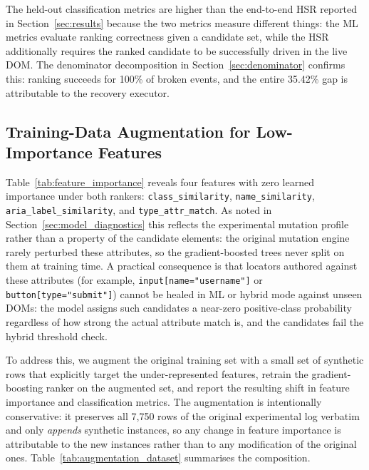 \documentclass[conference]{IEEEtran}
\begin{document}
The held-out classification metrics are higher than the end-to-end HSR reported in Section~\ref{sec:results} because the two metrics measure different things: the ML metrics evaluate ranking correctness given a candidate set, while the HSR additionally requires the ranked candidate to be successfully driven in the live DOM. The denominator decomposition in Section~\ref{sec:denominator} confirms this: ranking succeeds for 100\% of broken events, and the entire 35.42\% gap is attributable to the recovery executor.

\subsection{Training-Data Augmentation for Low-Importance Features}
\label{sec:augmentation}

Table~\ref{tab:feature_importance} reveals four features with zero learned importance under both rankers: \texttt{class\_similarity}, \texttt{name\_similarity}, \texttt{aria\_label\_similarity}, and \texttt{type\_attr\_match}. As noted in Section~\ref{sec:model_diagnostics} this reflects the experimental mutation profile rather than a property of the candidate elements: the original mutation engine rarely perturbed these attributes, so the gradient-boosted trees never split on them at training time. A practical consequence is that locators authored against these attributes (for example, \texttt{input[name="username"]} or \texttt{button[type="submit"]}) cannot be healed in ML or hybrid mode against unseen DOMs: the model assigns such candidates a near-zero positive-class probability regardless of how strong the actual attribute match is, and the candidates fail the hybrid threshold check.

To address this, we augment the original training set with a small set of synthetic rows that explicitly target the under-represented features, retrain the gradient-boosting ranker on the augmented set, and report the resulting shift in feature importance and classification metrics. The augmentation is intentionally conservative: it preserves all 7{,}750 rows of the original experimental log verbatim and only \emph{appends} synthetic instances, so any change in feature importance is attributable to the new instances rather than to any modification of the original ones. Table~\ref{tab:augmentation_dataset} summarises the composition.


\end{document}
